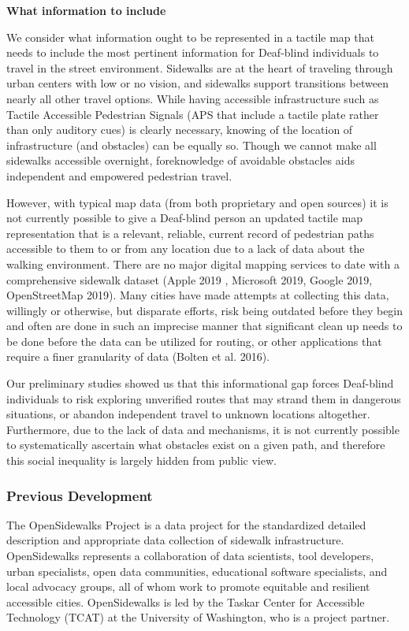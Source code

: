 \textbf{What information to include}

We consider what information ought to be represented in a tactile map that needs to include the most pertinent information for Deaf-blind individuals to travel in the street environment. Sidewalks are at the heart of traveling through urban centers with low or no vision, and sidewalks support transitions between nearly all other travel options. While having accessible infrastructure such as Tactile Accessible Pedestrian Signals (APS that include a tactile plate rather than only auditory cues) is clearly necessary, knowing of the location of infrastructure (and obstacles) can be equally so. Though we cannot make all sidewalks accessible overnight, foreknowledge of avoidable obstacles aids independent and empowered pedestrian travel.

However, with typical map data (from both proprietary and open sources) it is not currently possible to give a Deaf-blind person an updated tactile map representation that is a relevant, reliable, current record of pedestrian paths accessible to them to or from any location due to a lack of data about the walking environment.  
There are no major digital mapping services to date with a comprehensive sidewalk dataset (\ac{Apple 2019 , Microsoft  2019, Google 2019, OpenStreetMap 2019}). Many cities have made attempts at collecting this data, willingly or otherwise, but disparate efforts, risk being outdated before they begin and often are done in such an imprecise manner that significant clean up needs to be done before the data can be utilized for routing, or other applications that require a finer granularity of data \ac{(Bolten et al. 2016)}. 

Our preliminary studies showed us that this informational gap forces Deaf-blind individuals to risk exploring unverified routes that may strand them in dangerous situations, or abandon independent travel to unknown locations altogether. Furthermore, due to the lack of data and mechanisms, it is not currently possible to systematically ascertain what obstacles exist on a given path, and therefore this social inequality is largely hidden from public view.

\subsubsection{Previous Development}

The OpenSidewalks Project is a data project for the standardized detailed description and appropriate data collection of sidewalk infrastructure.
OpenSidewalks represents a collaboration of data scientists, tool developers, urban specialists, open data communities, educational software specialists, and local advocacy groups, all of whom work to promote equitable and resilient accessible cities.
OpenSidewalks is led by the Taskar Center for Accessible Technology (TCAT) at the University of Washington, who is a project partner.

